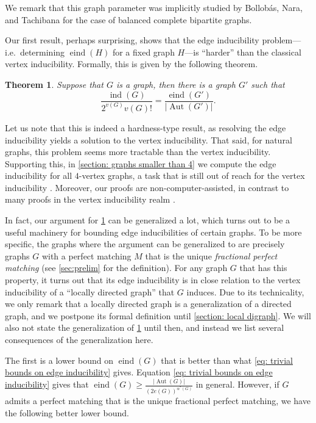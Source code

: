 \documentclass[reqno,11pt]{amsart}
\numberwithin{equation}{section}
\newtheorem{theorem}{Theorem}[section]
\theoremstyle{definition}
\theoremstyle{remark}
\newcommand{\abs}[1]{\left\lvert#1\right\rvert}
\DeclareMathOperator{\ind}{ind}
\DeclareMathOperator{\eind}{eind}
\DeclareMathOperator{\Aut}{Aut}
\begin{document}
We remark that this graph parameter was implicitly studied by  Bollob\'as, Nara, and Tachibana \cite{BolNarTac1986} for the case of balanced complete bipartite graphs. 

Our first result, perhaps surprising, shows that the edge inducibility problem---i.e.\ determining $\eind(H)$ for a fixed graph $H$---is ``harder'' than the classical vertex inducibility. Formally, this is given by the following theorem.
\begin{theorem}\label{thm:hardness-result}
	Suppose that $G$ is a graph, then there is a graph $G'$ such that
	\[
		 \frac{\ind(G)}{2^{v(G)} v(G)! }=\frac{\eind(G')}{|\Aut(G')|}.
	\]
\end{theorem}

Let us note that this is indeed a hardness-type result, as resolving the edge inducibility yields a solution to the vertex inducibility.
That said, for natural graphs, this problem seems more tractable than the vertex inducibility. Supporting this, in \cref{section: graphs smaller than 4} we compute the edge inducibility for all $4$-vertex graphs, a task that is still out of reach for the vertex inducibility \cite{EveLin2015,Hir2014}. Moreover, our proofs are non-computer-assisted, in contrast to many proofs in the vertex inducibility realm \cite{BonPik2025,EveLin2015,Hir2014,PikSliTyr2019}. 

In fact, our argument for \cref{thm:hardness-result} can be generalized a lot, which turns out to be a useful machinery for bounding edge inducibilities of certain graphs.
To be more specific, the graphs where the argument can be generalized to are precisely graphs $G$ with a perfect matching $M$ that is the unique \emph{fractional perfect matching} (see \cref{sec:prelim} for the definition).
For any graph $G$ that has this property, it turns out that its edge inducibility is in close relation to the vertex inducibility of a ``locally directed graph'' that $G$ induces.
Due to its technicality, we only remark that a locally directed graph is a generalization of a directed graph, and we postpone its formal definition until \cref{section: local digraph}.
We will also not state the generalization of \cref{thm:hardness-result} until then, and instead we list several consequences of the generalization here.

The first is a lower bound on $\eind(G)$ that is better than what \cref{eq: trivial bounds on edge inducibility} gives.
Equation \cref{eq: trivial bounds on edge inducibility} gives that $\eind(G)\geq \frac{\abs{\Aut(G)}}{(2e(G))^{\alpha^*(G)}}$ in general.
However, if $G$ admits a perfect matching that is the unique fractional perfect matching, we have the following better lower bound.
\end{document}
